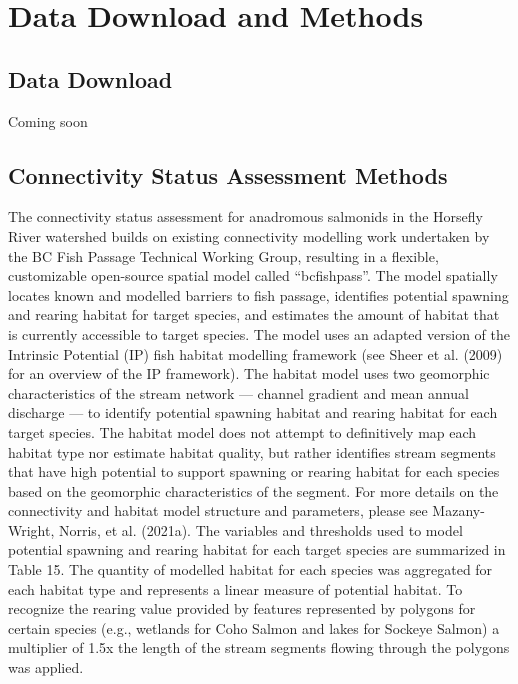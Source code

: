 \documentclass[
  letterpaper,
  DIV=11,
  numbers=noendperiod]{scrreprt}
\begin{document}
\renewcommand*{\arraystretch}{1}

\chapter*{Data Download and Methods}\label{data-download-and-methods}


\section*{Data Download}\label{data-download}


Coming soon

\section*{Connectivity Status Assessment
Methods}\label{connectivity-status-assessment-methods}


The connectivity status assessment for anadromous salmonids in the
Horsefly River watershed builds on existing connectivity modelling work
undertaken by the BC Fish Passage Technical Working Group, resulting in
a flexible, customizable open-source spatial model called
``bcfishpass''. The model spatially locates known and modelled barriers
to fish passage, identifies potential spawning and rearing habitat for
target species, and estimates the amount of habitat that is currently
accessible to target species. The model uses an adapted version of the
Intrinsic Potential (IP) fish habitat modelling framework (see Sheer et
al. (2009) for an overview of the IP framework). The habitat model uses
two geomorphic characteristics of the stream network --- channel
gradient and mean annual discharge --- to identify potential spawning
habitat and rearing habitat for each target species. The habitat model
does not attempt to definitively map each habitat type nor estimate
habitat quality, but rather identifies stream segments that have high
potential to support spawning or rearing habitat for each species based
on the geomorphic characteristics of the segment. For more details on
the connectivity and habitat model structure and parameters, please see
Mazany-Wright, Norris, et al. (2021a). The variables and thresholds used
to model potential spawning and rearing habitat for each target species
are summarized in Table 15. The quantity of modelled habitat for each
species was aggregated for each habitat type and represents a linear
measure of potential habitat. To recognize the rearing value provided by
features represented by polygons for certain species (e.g., wetlands for
Coho Salmon and lakes for Sockeye Salmon) a multiplier of 1.5x the
length of the stream segments flowing through the polygons was applied.
\end{document}
